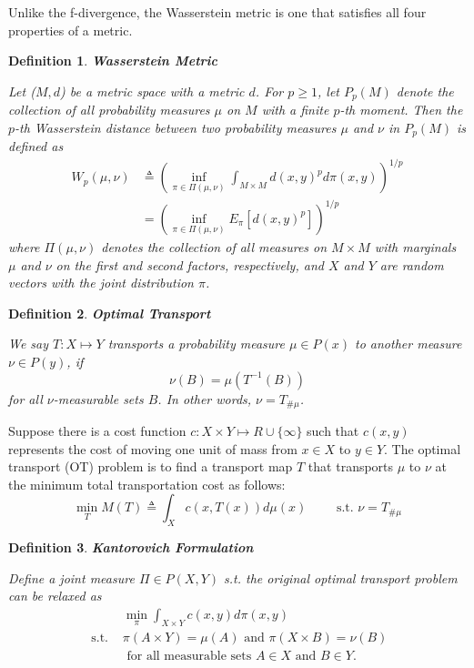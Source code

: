 \documentclass[12pt]{amsart}
\newtheorem{definition}{Definition}
\theoremstyle{plain}
\theoremstyle{definition}
\theoremstyle{remark}
\numberwithin{equation}{section}
\numberwithin{thm}{section}
\begin{document}
Unlike the f-divergence, the Wasserstein metric is one that satisfies all four properties of a metric.
\begin{definition} 
\textbf{Wasserstein Metric}

Let ($M,d$) be a metric space with a metric $d$.
For $p\geq1$, let $P_p(M)$ denote the collection of all probability measures $\mu$ on $M$ with a finite $p$-th moment. Then the $p$-th Wasserstein distance between two probability measures $\mu$ and $\nu$ in $P_p(M)$ is defined as
\begin{equation}
\begin{split}
     W_{p}(\mu,\nu) &\triangleq (\inf_{\pi \in \Pi(\mu,\nu)}\int_{M\times M}d(x,y)^{p}d\pi(x,y))^{1/p} \\
    &= (\inf_{\pi \in \Pi(\mu,\nu)}E_{\pi}[d(x,y)^{p}])^{1/p}
\end{split}
\end{equation}
where $\Pi(\mu,\nu)$ denotes the collection of all measures on $M\times M$ with marginals $\mu$ and $\nu$ on the first and second factors, respectively, and $X$ and $Y$ are random vectors with the joint distribution $\pi$.
\end{definition}

\begin{definition} 
\textbf{Optimal Transport}

We say $T: X \mapsto Y$ transports a probability measure $\mu \in P(x)$ to another measure $\nu \in P(y)$, if 
\begin{equation}
    \nu(B) = \mu(T^{-1}(B))  
\end{equation}
for all $\nu$-measurable sets $B$. In other words, $\nu=T_{\#\mu}$.  
\end{definition}

Suppose there is a cost function $c:X \times Y \longmapsto R \cup  \{\infty\} $ such that $c(x,y)$ represents the cost of moving one unit of mass from $x \in X$ to $y \in Y$. The optimal transport (OT) problem is to find a transport map $T$ that transports $\mu$ to $\nu$ at the minimum total transportation cost as follows:
\begin{equation}
    \min_{T}M(T) \triangleq \int_{X}c(x,T(x))d\mu(x) \qquad  \text{ s.t. } \nu = T_{\#\mu}
\end{equation}

\begin{definition} 
\textbf{Kantorovich Formulation}

Define a joint measure $\Pi \in P(X,Y)$ s.t. the original optimal transport problem can be relaxed as
\begin{equation}
\begin{aligned}
 & \min_{\pi} \int_{X \times Y}c(x,y)d\pi(x,y) \\
 \text{ s.t. }  & \pi(A \times Y) = \mu(A) \text{ and } \pi(X \times B) = \nu(B) \\
 & \text{ for all measurable sets } A \in X \text{ and } B \in Y.
\end{aligned} 
\end{equation}
\end{definition}
\end{document}
